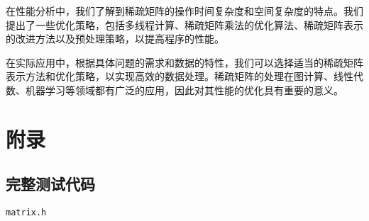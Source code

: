 \documentclass[12pt]{article}
\begin{document}
在性能分析中，我们了解到稀疏矩阵的操作时间复杂度和空间复杂度的特点。我们提出了一些优化策略，包括多线程计算、稀疏矩阵乘法的优化算法、稀疏矩阵表示的改进方法以及预处理策略，以提高程序的性能。

在实际应用中，根据具体问题的需求和数据的特性，我们可以选择适当的稀疏矩阵表示方法和优化策略，以实现高效的数据处理。稀疏矩阵的处理在图计算、线性代数、机器学习等领域都有广泛的应用，因此对其性能的优化具有重要的意义。

\newpage

\appendix

\section{附录}

\subsection{完整测试代码}

\texttt{matrix.h}
\end{document}
